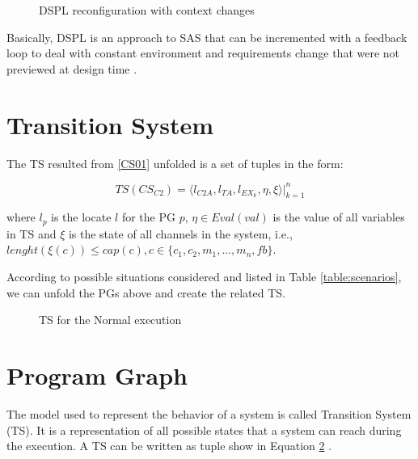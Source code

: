 \begin{figure}[h]
\centering
\label{dspl01}
\scalebox{.5}{}
\caption{DSPL reconfiguration with context changes}
\end{figure}

Basically, DSPL is an approach to SAS that can be incremented with a feedback loop to deal with constant environment and requirements change that were not previewed at design time \cite{SAS100-04}.




\section {Transition System}


The TS resulted from \ref{CS01} unfolded is a set of tuples in the form:

\begin{equation}
\label{CS02}
    TS(CS_{C2})=\langle l_{C2A}, l_{TA}, l_{EX_k}, \eta, \xi \rangle |_{k=1}^n
\end{equation}

where $l_p$ is the locate $l$ for the PG $p$, $\eta \in Eval(val)$ is the value of all variables in TS and $\xi$ is the state of all channels in the system, i.e., $lenght(\xi(c)) \leq cap(c), c \in \{c_1, c_2, m_1, ..., m_n, fb\}$.

According to possible situations considered and listed in Table \ref{table:scenarios}, we can unfold the PGs above and create the related TS.

\begin{figure}[h!]
\centering
\label{TS01}
\scalebox{.8}{}
\caption{TS for the Normal execution}
\end{figure}



\section {Program Graph}

The model used to represent the behavior of a system is called Transition System (TS). It is a representation of all possible states that a system can reach during the execution. A TS can be written as tuple show in Equation \ref{TS01} .

